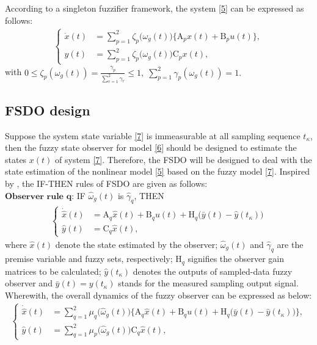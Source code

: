 \documentclass[preprint,11pt]{elsarticle}
\begin{document}
According to a singleton fuzzifier framework, the system \eqref{5} can be expressed as follows:
\begin{align}\label{7}
\begin{cases}
\dot{x}(t)&=\sum^{2}_{p=1}\zeta_p\big( \omega_g(t) \big)\big\{\mathrm{A}_{p}x(t)+\mathrm{B}_{p}u(t)\big\},\\
y(t)&=\sum^{2}_{p=1}\zeta_p\big( \omega_g(t) \big)\mathrm{C}_{p}x(t),\;
\end{cases}
\end{align}
with
$
0\leq\zeta_p(\omega_g(t))=\frac{\gamma_p}{\sum^2_{r=1}\gamma_r}\leq 1,\;\sum^2_{p=1}\gamma_p(\omega_g(t))=1.
$
\subsection{FSDO design}
Suppose the system state variable \eqref{7} is immeasurable at all sampling sequence $t_\kappa$, then the fuzzy state observer for model \eqref{6} should be designed to estimate the states $x(t)$ of system \eqref{7}. {Therefore, the FSDO will be designed to deal with the state estimation of the nonlinear model \eqref{5} based on the fuzzy model \eqref{7}. Inspired by \cite{sub1,obs0,obs1}, the IF-THEN rules of FSDO are given as follows:}\\
$\textbf{Observer rule q:}$ {IF} $\hat{\omega}_g(t)$ is $\hat{\gamma}_{q}$, {THEN}
\begin{align}\label{9a}
\begin{cases}
\dot{\hat{x}}(t)&=\mathrm{A}_{q}\hat{x}(t)+\mathrm{B}_{q}u(t)+\mathrm{H}_q\big(\bar{y}(t) -\hat{y}(t_\kappa) \big)\\
\hat{y}(t)&=\mathrm{C}_{q}\hat{x}(t),\;
\end{cases}
\end{align}
where $\hat{x}(t)$ denote the state estimated by the observer; $\hat{\omega}_g(t)$ and $\hat{\gamma}_{q}$ are the premise variable and fuzzy sets, respectively; $\mathrm{H}_q$ signifies the observer gain matrices to be calculated; $\hat{y}(t_\kappa)$ denotes the outputs of sampled-data fuzzy observer and $\bar{y}(t)=y(t_\kappa)$ stands for the measured sampling output signal. Wherewith, the overall dynamics of the fuzzy observer can be expressed as below:
\begin{align}\label{9}
\begin{cases}
\dot{\hat{x}}(t)&=\sum^{2}_{q=1}\mu_q\big( \hat{\omega}_g(t) \big)\big\{\mathrm{A}_{q}\hat{x}(t)+\mathrm{B}_{q}u(t)
+\mathrm{H}_q\big(\bar{y}(t) -\hat{y}(t_\kappa) \big)\big\},\\
\hat{y}(t)&=\sum^{2}_{q=1}\mu_p\big( \hat{\omega}_g(t) \big)\mathrm{C}_{q}\hat{x}(t),
\end{cases}
\end{align}
\end{document}
